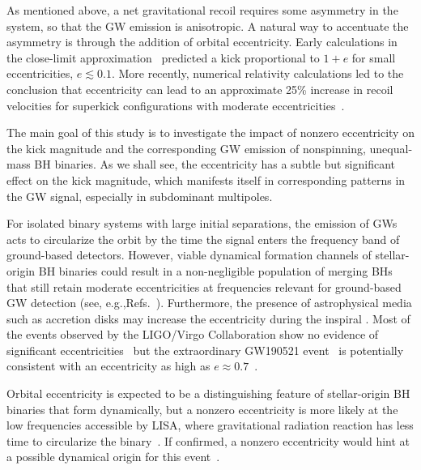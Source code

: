 \documentclass[floats,floatfix,showpacs,amssymb,physrev,twocolumn,superscriptaddress,reprint,
nofootinbib, longbibliography]{revtex4-2}
\begin{document}
As mentioned above, a net gravitational recoil requires some asymmetry in the
system, so that the GW emission is anisotropic.
A natural way to
accentuate the asymmetry is through the addition of orbital
eccentricity. Early calculations in the close-limit
approximation~\cite{Sopuerta:2006et} predicted a kick proportional to
$1+e$ for small eccentricities, $e\lesssim 0.1$.  More recently,
numerical relativity calculations led to the conclusion that
eccentricity can lead to an approximate 25\% increase in recoil
velocities for superkick configurations with moderate
eccentricities~\cite{Sperhake:2019wwo}.

The main goal of this study is to investigate the impact of nonzero
eccentricity on the kick magnitude and the corresponding GW emission
of nonspinning, unequal-mass BH binaries.  As we shall see, the
eccentricity has a subtle but significant effect on the kick
magnitude, which manifests itself in corresponding patterns in the GW
signal, especially in subdominant multipoles.

For isolated binary systems with large initial separations, the
emission of GWs acts to circularize the orbit by the time the signal
enters the frequency band of ground-based detectors.  However, viable
dynamical formation channels of stellar-origin BH binaries could
result in a non-negligible population of merging BHs that still retain
moderate eccentricities at frequencies relevant for ground-based GW
detection (see,
e.g.,Refs.~\cite{Samsing:2017rat,Samsing:2017xmd,Samsing:2017oij,Rodriguez:2018pss,Samsing:2020tda,Tagawa:2020jnc}).
Furthermore, the presence of astrophysical media such as
accretion disks may increase the eccentricity during the inspiral
\cite{Cardoso:2020iji}.
Most of the events observed by the LIGO/Virgo Collaboration show no
evidence of significant eccentricities~\cite{Salemi:2019owp} but the
extraordinary GW190521 event~\cite{Abbott:2020tfl} is potentially
consistent with an eccentricity as high as
$e\approx0.7$~\cite{Romero-Shaw:2020thy,Gayathri:2020coq}.

Orbital eccentricity is expected to be a distinguishing feature of
stellar-origin BH binaries that form dynamically, but a nonzero
eccentricity is more likely at the low frequencies accessible by LISA,
where gravitational radiation reaction has less time to circularize
the binary~\cite{Nishizawa:2016jji,Breivik:2016ddj,Nishizawa:2016eza}.
If confirmed, a nonzero eccentricity would hint at a possible
dynamical origin for this event~\cite{Romero-Shaw:2020thy}.
\end{document}
